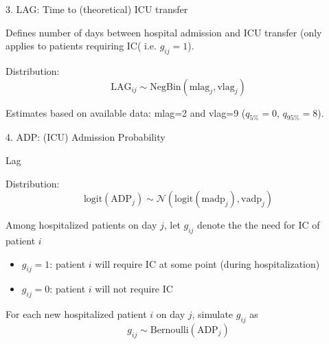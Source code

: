 \documentclass[t,9pt,xcolor=dvipsnames]{beamer}              %
\begin{document}
\begin{frame}{3. LAG: Time to (theoretical) ICU transfer}

Defines number of days between hospital admission and ICU transfer (only applies to patients requiring IC( i.e. $g_{ij}=1$).
\medskip

Distribution:
\begin{equation*}
\text{LAG}_{ij} \sim \text{NegBin}\left(\text{mlag}_{j}, \text{vlag}_{j}\right)
\end{equation*}
\medskip

Estimates based on available data: mlag=2 and vlag=9 ($q_{5\%}=0$, $q_{95\%}=8$).

\note{
\tiny
\justifying

}
\end{frame}

\begin{frame}{4. ADP: (ICU) Admission Probability}

Lag


Distribution:
\begin{equation*}
\text{logit}(\text{ADP}_{j}) \sim \mathcal{N}\left(\text{logit}(\text{madp}_{j}), \text{vadp}_{j}\right)
\end{equation*}

\alert{Among hospitalized patients on day $j$}, let $g_{ij}$ denote the the need for IC of patient $i$
\begin{itemize}
\item $g_{ij}=1$: patient $i$ will require IC at some point (during hospitalization)
\item $g_{ij}=0$: patient $i$ will not require IC
\end{itemize}

For each new hospitalized patient $i$ on day $j$, simulate $g_{ij}$ as
\begin{equation*}
g_{ij} \sim \text{Bernoulli}\left(\text{ADP}_{j}\right)
\end{equation*} 

\note{
\tiny
\justifying

}
\end{frame}
\end{document}
